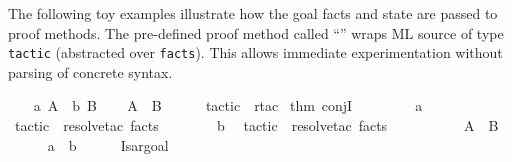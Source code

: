 \begin{isabellebody}
\begin{isamarkuptext}
  \medskip The following toy examples illustrate how the goal facts
  and state are passed to proof methods.  The pre-defined proof method
  called ``\hyperlink{method.tactic}{\mbox{}}'' wraps ML source of type \verb|tactic| (abstracted over \verb|facts|).  This allows immediate
  experimentation without parsing of concrete syntax.%
\end{isamarkuptext}%
\isamarkuptrue%
%
\endisatagmlex
{\isafoldmlex}%
%
\isadelimmlex
%
\endisadelimmlex
{}\isamarkupfalse%
\isanewline
%
\isadelimproof
\ \ %
\endisadelimproof
%
\isatagproof
{}\isamarkupfalse%
\ a{}\ A\ \ b{}\ B\isanewline
\isanewline
\ \ \isamarkupfalse%
\ {}A\ {}\ B{}\isanewline
\ \ \ \ \isamarkupfalse%
\ {}tactic\ {}\ rtac\ %
\isaantiq
thm\ conjI{}%
\endisaantiq
\ {}\ {}{}\isanewline
\ \ \ \ \isamarkupfalse%
\ a\ \isamarkupfalse%
\ {}tactic\ {}\ resolve{}tac\ facts\ {}\ {}{}\isanewline
\ \ \ \ \isamarkupfalse%
\ b\ \isamarkupfalse%
\ {}tactic\ {}\ resolve{}tac\ facts\ {}\ {}{}\isanewline
\ \ \ \ \isamarkupfalse%
\isanewline
\isanewline
\ \ \isamarkupfalse%
\ {}A\ {}\ B{}\isanewline
\ \ \ \ \isamarkupfalse%
\ a\ \ b%
\endisatagproof
{\isafoldproof}%
%
\isadelimproof
\isanewline
%
\endisadelimproof
%
\isadelimML
\ \ \ \ %
\endisadelimML
%
\isatagML
{}\isamarkupfalse%
\ {}{}{}Isar{}goal{}{}%

\end{isabellebody}
